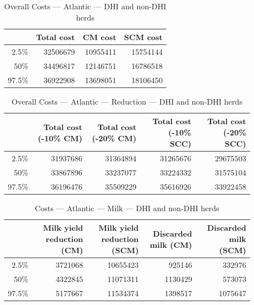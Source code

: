 \documentclass{article}\usepackage[]{graphicx}\usepackage[]{color}
\begin{document}
\begin{table}[ht]
\centering
\begin{tabular}{rrrr}
  \hline
 & Total cost & CM cost & SCM cost \\ 
  \hline
2.5\% & 32506679 & 10955411 & 15754144 \\ 
  50\% & 34496817 & 12146751 & 16786518 \\ 
  97.5\% & 36922908 & 13698051 & 18106450 \\ 
   \hline
\end{tabular}
\caption{Overall Costs --- Atlantic --- DHI and non-DHI herds} 
\label{tab:atlantic2:overall}
\end{table}
\begin{table}[ht]
\centering
\begin{tabular}{rrrrr}
  \hline
 & Total cost (-10\% CM) & Total cost (-20\% CM) & Total cost (-10\% SCC) & Total cost (-20\% SCC) \\ 
  \hline
2.5\% & 31937686 & 31364894 & 31265676 & 29675503 \\ 
  50\% & 33867896 & 33237077 & 33224332 & 31575104 \\ 
  97.5\% & 36196476 & 35509229 & 35616926 & 33922458 \\ 
   \hline
\end{tabular}
\caption{Overall Costs --- Atlantic --- Reduction --- DHI and non-DHI herds} 
\label{tab:atlantic2:reduction}
\end{table}
\begin{table}[ht]
\centering
\begin{tabular}{rrrrr}
  \hline
 & Milk yield reduction (CM) & Milk yield reduction (SCM) & Discarded milk (CM) & Discarded milk (SCM) \\ 
  \hline
2.5\% & 3721068 & 10655423 & 925146 & 332976 \\ 
  50\% & 4322845 & 11071311 & 1130429 & 573073 \\ 
  97.5\% & 5177667 & 11534374 & 1398517 & 1075647 \\ 
   \hline
\end{tabular}
\caption{Costs --- Atlantic --- Milk --- DHI and non-DHI herds} 
\label{tab:atlantic2:a}
\end{table}
\end{document}
